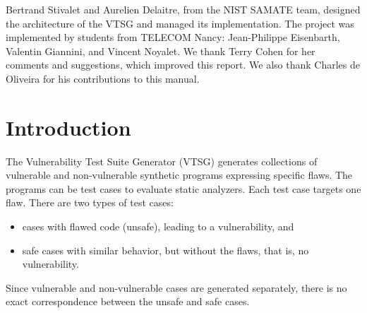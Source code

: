\begin{titlepage}
Bertrand Stivalet and Aurelien Delaitre, from the NIST SAMATE team, designed the
architecture of the VTSG and managed its implementation.  The project was
implemented by students from TELECOM Nancy: Jean-Philippe Eisenbarth, Valentin
Giannini, and Vincent Noyalet.  We thank Terry Cohen for her comments and
suggestions, which improved this report.  We also thank
Charles de Oliveira for his contributions to this manual.
%
%
%
%

\end{titlepage}
\pagestyle{fancy}
\renewcommand{\headrulewidth}{0pt}
  \fancyhead{}
  \fancyhead[l]{\small \pubnumber \\
	\small \pubmonth~\pubyear \\}

\newpage

\section{Introduction}

The Vulnerability Test Suite Generator (VTSG) generates collections 
of vulnerable and non-vulnerable
synthetic programs expressing specific flaws.  
The programs can be
test cases to evaluate static analyzers. 
Each test case targets one flaw. There are two types of test cases:
\begin{itemize}[nosep]
  \item cases with flawed code (unsafe), leading to a vulnerability, and
  \item safe cases with similar behavior, but without the flaws, that is, no
	vulnerability.
\end{itemize}
Since vulnerable and non-vulnerable cases are generated separately, there is no
exact correspondence between the unsafe and safe
cases.


